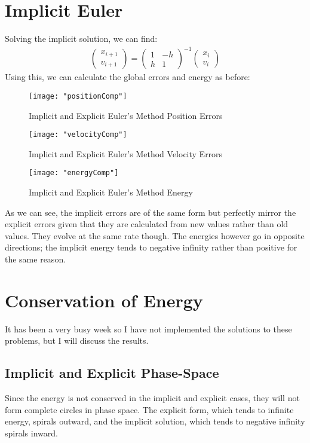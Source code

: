 \documentclass{article}
\begin{document}
\section{Implicit Euler}
Solving the implicit solution, we can find:
\begin{align*}
	\begin{pmatrix}
		x_{i + 1} \\
		v_{i + 1}
	\end{pmatrix}
	=
	\begin{pmatrix}
		1 & -h \\
		h & 1
	\end{pmatrix} ^{-1}
	\begin{pmatrix}
		x_{i} \\
		v_{i}
	\end{pmatrix}
\end{align*}
Using this, we can calculate the global errors and energy as before:
\begin{figure}[h!]
	\centering
	\texttt{[image: "positionComp"]}
	\caption{Implicit and Explicit Euler's Method Position Errors}
\end{figure} 
\begin{figure}[h!]
	\centering
	\texttt{[image: "velocityComp"]}
	\caption{Implicit and Explicit Euler's Method Velocity Errors}
\end{figure} 
\begin{figure}[h!]
	\centering
	\texttt{[image: "energyComp"]}
	\caption{Implicit and Explicit Euler's Method Energy}
\end{figure} 
\FloatBarrier
As we can see, the implicit errors are of the same form but perfectly mirror the explicit errors given that they are calculated from new values rather
than old values. They evolve at the same rate though. The energies however go in opposite directions; the implicit energy tends to negative
infinity rather than positive for the same reason.


\section{Conservation of Energy}
It has been a very busy week so I have not implemented the solutions to these problems, but I will discuss the results. 
\subsection{Implicit and Explicit Phase-Space}
Since the energy is not conserved in the implicit and explicit cases, they will not form complete circles in phase space. The explicit
form, which tends to infinite energy, spirals outward, and the implicit solution, which tends to negative infinity spirals inward.
\end{document}
